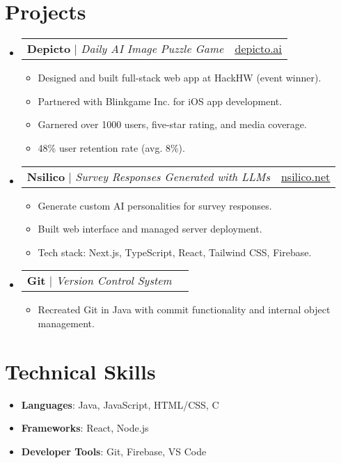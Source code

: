 \documentclass[letterpaper,11pt]{article}
\makeatletter
\newcommand{\resumeItem}[1]{\item\small{#1 \vspace{-2pt}}}
\newcommand{\resumeProjectHeading}[2]{
    \item
    \begin{tabular*}{0.97\textwidth}{l@{\extracolsep{\fill}}r}
      \small#1 & #2 \\
    \end{tabular*}\vspace{-5pt}
}
\newcommand{\resumeItemListStart}{\begin{itemize}[leftmargin=0.15in]}
\newcommand{\resumeItemListEnd}{\end{itemize}\vspace{-5pt}}
\makeatother
\begin{document}
\section{Projects}
\resumeItemListStart
  \resumeProjectHeading
      {\textbf{Depicto} $|$ \emph{Daily AI Image Puzzle Game}}{ \href{depicto.ai}{\underline{depicto.ai}}}
      \resumeItemListStart
        \resumeItem{Designed and built full-stack web app at HackHW (event winner).}
        \resumeItem{Partnered with Blinkgame Inc. for iOS app development.}
        \resumeItem{Garnered over 1000 users, five-star rating, and media coverage.}
        \resumeItem{48\% user retention rate (avg. 8\%).}
      \resumeItemListEnd

  \resumeProjectHeading
      {\textbf{Nsilico} $|$ \emph{Survey Responses Generated with LLMs}}{ \href{nsilico.net}{\underline{nsilico.net}}}
      \resumeItemListStart
        \resumeItem{Generate custom AI personalities for survey responses.}
        \resumeItem{Built web interface and managed server deployment.}
        \resumeItem{Tech stack: Next.js, TypeScript, React, Tailwind CSS, Firebase.}
      \resumeItemListEnd

  \resumeProjectHeading
      {\textbf{Git} $|$ \emph{Version Control System}}{}
      \resumeItemListStart
        \resumeItem{Recreated Git in Java with commit functionality and internal object management.}
      \resumeItemListEnd
\resumeItemListEnd

\section{Technical Skills}
\resumeItemListStart
    \resumeItem{\textbf{Languages}: Java, JavaScript, HTML/CSS, C}
    \resumeItem{\textbf{Frameworks}: React, Node.js}
    \resumeItem{\textbf{Developer Tools}: Git, Firebase, VS Code}
\resumeItemListEnd
\end{document}
